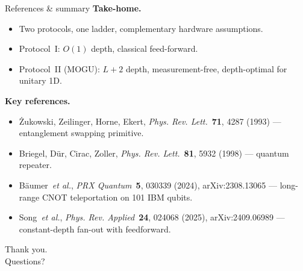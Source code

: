 \documentclass[aspectratio=169,10pt]{beamer}
\begin{document}
\begin{frame}[allowframebreaks]{References \& summary}
  \textbf{Take-home.}
  \begin{itemize}
    \item Two protocols, one ladder, complementary hardware assumptions.
    \item Protocol~I: $O(1)$ depth, classical feed-forward.
    \item Protocol~II (MOGU): $L+2$ depth, measurement-free, depth-optimal for unitary 1D.
  \end{itemize}

  \medskip
  \textbf{Key references.}
  \begin{itemize}\footnotesize
    \item Żukowski, Zeilinger, Horne, Ekert,
          \emph{Phys. Rev. Lett.}~\textbf{71}, 4287 (1993) — entanglement swapping primitive.
    \item Briegel, Dür, Cirac, Zoller,
          \emph{Phys. Rev. Lett.}~\textbf{81}, 5932 (1998) — quantum repeater.
    \item Bäumer~\textit{et al.},
          \emph{PRX Quantum}~\textbf{5}, 030339 (2024), arXiv:2308.13065 —
          long-range CNOT teleportation on 101 IBM qubits.
    \item Song~\textit{et al.},
          \emph{Phys. Rev. Applied}~\textbf{24}, 024068 (2025), arXiv:2409.06989 —
          constant-depth fan-out with feedforward.
  \end{itemize}

  \medskip
  \centering\Large Thank you. \\[0.3em]
  \small Questions?
\end{frame}
\end{document}
